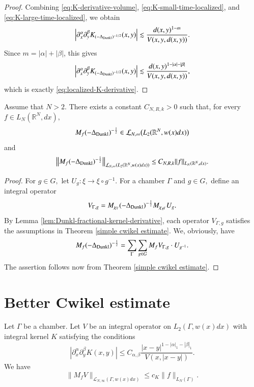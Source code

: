 \documentclass[12pt]{amsart}
\begin{document}
\begin{proof}
Combining
\eqref{eq:K-derivative-volume},
\eqref{eq:K-small-time-localized}, and
\eqref{eq:K-large-time-localized}, we obtain
\[
\left|
\partial_x^\alpha\partial_y^\beta
K_{(-\Delta_{{\rm Dunkl}})^{-1/2}}(x,y)
\right|
\lesssim
\frac{d(x,y)^{1-m}}{V(x,y,d(x,y))}.
\]
Since $m=|\alpha|+|\beta|$, this gives
\[
\left|
\partial_x^\alpha\partial_y^\beta
K_{(-\Delta_{{\rm Dunkl}})^{-1/2}}(x,y)
\right|
\lesssim
\frac{
d(x,y)^{1-|\alpha|-|\beta|}
}{
V(x,y,d(x,y))
},
\]
which is exactly \eqref{eq:localized-K-derivative}.
\end{proof}

\begin{lemma}\label{lem:Cwikel-Dunkl}
Assume that $N>2.$ There exists a constant $C_{N,R,k}>0$ such that, for every
$f\in L_N(\mathbb{R}^N,dx),$
$$M_f(-\Delta_{{\rm Dunkl}})^{-\frac12}\in
\mathcal{L}_{N,\infty}\bigl(L_2(\mathbb{R}^N,w(x)dx)\bigr)$$
and
\begin{equation}\label{eq:Cwikel-Dunkl}
\bigl\|M_f(-\Delta_{{\rm Dunkl}})^{-\frac12}\bigr\|_
{\mathcal{L}_{N,\infty}(L_2(\mathbb{R}^N,w(x)dx))}\leq C_{N,R,k}\|f\|_{L_N(\mathbb{R}^N,dx)}.
\end{equation}
\end{lemma}
\begin{proof} For $g\in G,$ let $U_g:\xi\to\xi\circ g^{-1}.$ For a chamber $\Gamma$ and $g\in G,$ define an integral operator
$$V_{\Gamma,g}=M_{\chi_{\Gamma}}(-\Delta_{{\rm Dunkl}})^{-\frac12}M_{\chi_{g\Gamma}}U_g.$$
By Lemma \ref{lem:Dunkl-fractional-kernel-derivative}, each operator $V_{\Gamma,g}$ satisfies the assumptions in Theorem \ref{simple cwikel estimate}. We, obviously, have
$$M_f(-\Delta_{{\rm Dunkl}})^{-\frac12}=\sum_{\Gamma}\sum_{g\in G}M_fV_{\Gamma,g}\cdot U_{g^{-1}}.$$
The assertion follows now from Theorem \ref{simple cwikel estimate}.
\end{proof}


\section{Better Cwikel estimate}

\begin{theorem}\label{simple cwikel estimate} Let $\Gamma$ be a chamber. Let $V$ be an integral operator on $L_2(\Gamma,w(x)dx)$ with integral kernel $K$ satisfying the conditions
$$|\partial_x^{\alpha}\partial_y^{\beta}K(x,y)|\leq C_{\alpha,\beta}\frac{|x-y|^{1-|\alpha|_1-|\beta|_1}}{V(x,|x-y|)}.$$
We have
$$\|M_fV\|_{\mathcal{L}_{N,\infty}(\Gamma,w(x)dx)}\leq c_K\|f\|_{L_N(\Gamma)}.$$
\end{theorem}
\end{document}
